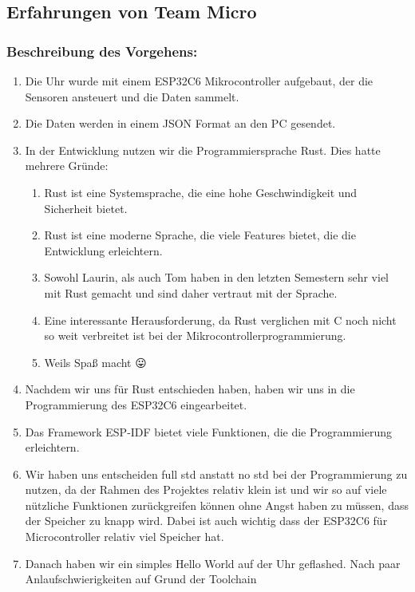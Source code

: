\documentclass[a4paper, 11pt]{article}
\begin{document}
\subsection{Erfahrungen von Team Micro}

\subsubsection{Beschreibung des Vorgehens:}

\begin{enumerate}
    \item Die Uhr wurde mit einem ESP32C6 Mikrocontroller aufgebaut, der die Sensoren ansteuert und die Daten sammelt.
    \item Die Daten werden in einem JSON Format an den PC gesendet.
    \item In der Entwicklung nutzen wir die Programmiersprache Rust. Dies hatte mehrere Gründe:
    \begin{enumerate}
        \item Rust ist eine Systemsprache, die eine hohe Geschwindigkeit und Sicherheit bietet.
        \item Rust ist eine moderne Sprache, die viele Features bietet, die die Entwicklung erleichtern.
        \item Sowohl Laurin, als auch Tom haben in den letzten Semestern sehr viel mit Rust gemacht und sind daher vertraut mit der Sprache.
        \item Eine interessante Herausforderung, da Rust verglichen mit C noch nicht so weit verbreitet ist bei der Mikrocontrollerprogrammierung.
        \item Weils Spaß macht 😛
    \end{enumerate}
    \item Nachdem wir uns für Rust entschieden haben, haben wir uns in die Programmierung des ESP32C6 eingearbeitet.
    \item Das Framework ESP-IDF bietet viele Funktionen, die die Programmierung erleichtern.
    \item Wir haben uns entscheiden full std anstatt no std bei der Programmierung zu nutzen, da der Rahmen des Projektes
    relativ klein ist und wir so auf viele nützliche Funktionen zurückgreifen können ohne Angst haben zu müssen,
    dass der Speicher zu knapp wird. Dabei ist auch wichtig dass der ESP32C6 für Microcontroller relativ viel Speicher hat.
    \item Danach haben wir ein simples Hello World auf der Uhr geflashed. Nach paar Anlaufschwierigkeiten auf Grund der Toolchain 

\end{enumerate}
\end{document}
